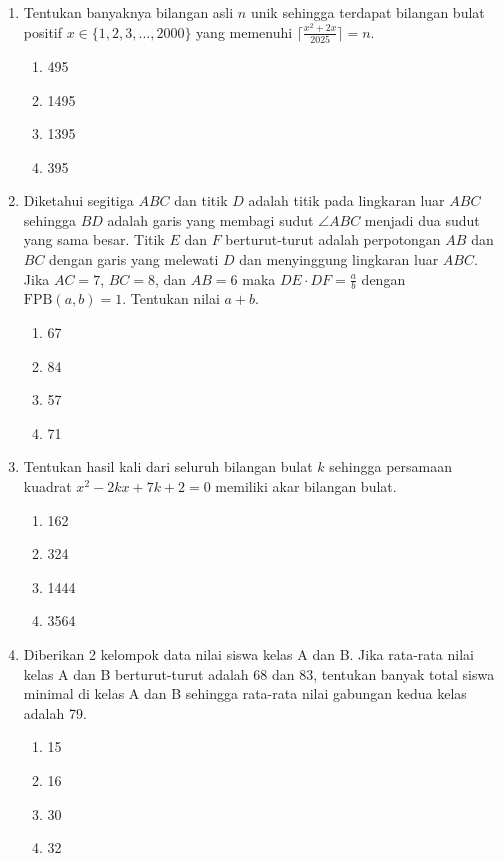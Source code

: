 \documentclass[12pt]{scrartcl}
\begin{document}
\begin{enumerate}
    \item Tentukan banyaknya bilangan asli $n$ unik sehingga terdapat bilangan bulat positif $x \in \{1,2,3,\dots,2000\}$ yang memenuhi $\lceil\frac{x^{2}+2x}{2025}\rceil=n$.
    \begin{enumerate}
        \item 495
        \item 1495
        \item 1395
        \item 395
    \end{enumerate}

    \item Diketahui segitiga $ABC$ dan titik $D$ adalah titik pada lingkaran luar $ABC$ sehingga $BD$ adalah garis yang membagi sudut $\angle ABC$ menjadi dua sudut yang sama besar. Titik $E$ dan $F$ berturut-turut adalah perpotongan $AB$ dan $BC$ dengan garis yang melewati $D$ dan menyinggung lingkaran luar $ABC$. Jika $AC=7$, $BC=8$, dan $AB=6$ maka $DE \cdot DF=\frac{a}{b}$ dengan $\text{FPB}(a,b)=1$. Tentukan nilai $a+b$.
    \begin{enumerate}
        \item 67
        \item 84
        \item 57
        \item 71
    \end{enumerate}

    \item Tentukan hasil kali dari seluruh bilangan bulat $k$ sehingga persamaan kuadrat $x^{2}-2kx+7k+2=0$ memiliki akar bilangan bulat.
    \begin{enumerate}
        \item 162
        \item 324
        \item 1444
        \item 3564
    \end{enumerate}

    \item Diberikan 2 kelompok data nilai siswa kelas A dan B. Jika rata-rata nilai kelas A dan B berturut-turut adalah 68 dan 83, tentukan banyak total siswa minimal di kelas A dan B sehingga rata-rata nilai gabungan kedua kelas adalah 79.
    \begin{enumerate}
        \item 15
        \item 16
        \item 30
        \item 32
    \end{enumerate}


\end{enumerate}
\end{document}
